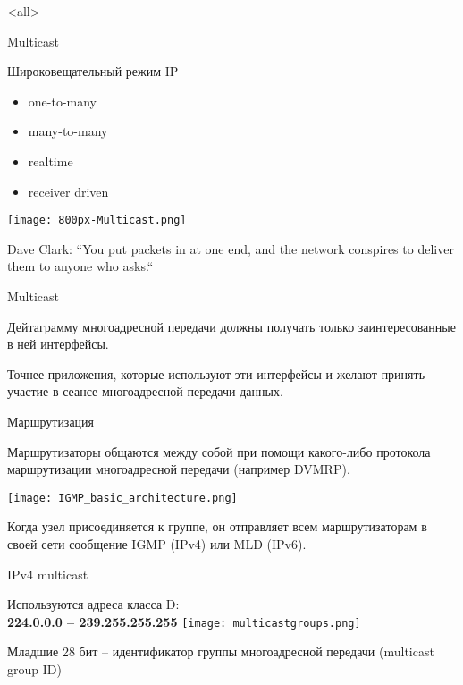 

\subtitle{Multicast}



\mode<all>{}

%
%

\begin{frame}{Multicast}

	\begin{block}{Широковещательный режим IP}
		\begin{itemize}
			\item one-to-many
			\item many-to-many
			\item realtime
			\item receiver driven
		\end{itemize}
	\end{block}

	\center\texttt{[image: 800px-Multicast.png]}

	Dave Clark: ``You put packets in at one end,  and the network conspires to deliver them to anyone who asks.``

\end{frame}

\begin{frame}{Multicast}

	Дейтаграмму многоадресной передачи должны получать только заинтересованные в ней интерфейсы. 
	
	Точнее приложения, которые используют эти интерфейсы и желают принять участие в сеансе многоадресной передачи данных.

\end{frame}

\begin{frame}{Маршрутизация}

	Маршрутизаторы общаются между собой при помощи какого-либо протокола маршрутизации многоадресной передачи
	(например DVMRP).


	\center\texttt{[image: IGMP\_basic\_architecture.png]}
	
	Когда узел присоединяется к группе,  он отправляет всем маршрутизаторам в своей сети 
	сообщение IGMP (IPv4) или MLD (IPv6).

\end{frame}


\begin{frame}{IPv4 multicast}

	Используются адреса класса D:\\
	{\bf 224.0.0.0 -- 239.255.255.255}
	\center\texttt{[image: multicastgroups.png]}

	\bigskip

	Младшие 28 бит -- идентификатор группы многоадресной передачи (multicast group ID)

\end{frame}


